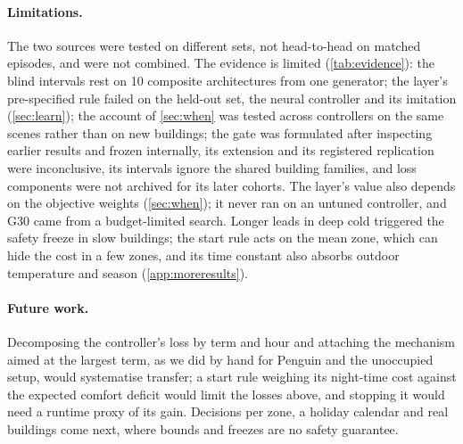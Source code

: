 \documentclass{article}
\begin{document}
\paragraph{Limitations.}
The two sources were tested on different sets, not head-to-head on matched episodes, and were not combined. The evidence is limited (\cref{tab:evidence}): the blind intervals rest on 10 composite
architectures from one generator; the layer's pre-specified rule failed on the held-out set, the neural controller and its
imitation (\cref{sec:learn}); the account of \cref{sec:when} was tested across controllers on the same scenes
rather than on new buildings; the gate was formulated after inspecting
earlier results and frozen internally, its extension and its registered replication were inconclusive, its intervals
ignore the shared building families, and loss components were not archived for its later cohorts. The layer's value also depends on the objective weights (\cref{sec:when}); it never ran on an
untuned controller, and G30 came from a budget-limited search. Longer leads in deep cold triggered the safety freeze in
slow buildings; the start rule acts on the mean zone, which can hide the cost in a few zones, and its time constant also
absorbs outdoor temperature and season (\cref{app:moreresults}).

\paragraph{Future work.}
Decomposing the controller's loss by term and hour and attaching the mechanism aimed at the largest term, as we did by
hand for Penguin and the unoccupied setup, would systematise transfer; a start rule weighing its night-time cost
against the expected comfort deficit would limit the losses above, and stopping it would need a runtime proxy of its
gain. Decisions per zone, a holiday calendar and real buildings come next, where bounds and freezes are no safety guarantee.

\end{document}
